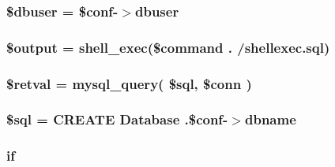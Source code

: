\subsubsection[{\$dbuser}]{\setlength{\rightskip}{0pt plus 5cm}\$dbuser = \$conf-\/$>$dbuser}\label{create_8php_a8d5ac1c3396a540f025f9bbe56a5b568}
\hypertarget{create_8php_a73004ce9cd673c1bfafd1dc351134797}{}
\subsubsection[{\$output}]{\setlength{\rightskip}{0pt plus 5cm}\$output = shell\+\_\+exec(\$command . \textquotesingle{}/shellexec.\+sql\textquotesingle{})}\label{create_8php_a73004ce9cd673c1bfafd1dc351134797}
\hypertarget{create_8php_ad78265bb473309fdfd2bc017c8cffe81}{}
\subsubsection[{\$retval}]{\setlength{\rightskip}{0pt plus 5cm}\$retval = mysql\+\_\+query( \$sql, \$conn )}\label{create_8php_ad78265bb473309fdfd2bc017c8cffe81}
\hypertarget{create_8php_a047170d6020a882807665812a27e2525}{}
\subsubsection[{\$sql}]{\setlength{\rightskip}{0pt plus 5cm}\$sql = \textquotesingle{}C\+R\+E\+A\+T\+E Database \textquotesingle{}.\$conf-\/$>$dbname}\label{create_8php_a047170d6020a882807665812a27e2525}
\hypertarget{create_8php_ac03413b0bbad0517a33ff8eb0e706f91}{}
\subsubsection[{if}]{\setlength{\rightskip}{0pt plus 5cm}if}\label{create_8php_ac03413b0bbad0517a33ff8eb0e706f91}
